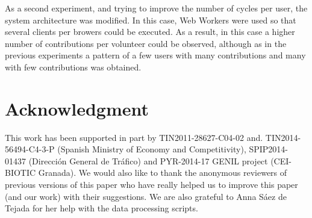 \documentclass[journal,onecolumn]{IEEEtran}
\begin{document}
As a second experiment, and trying to improve the number of cycles per user, the system architecture was modified. In this case, Web Workers were used so that several clients per browers could be executed.
As a result, in this case a higher number of contributions per volunteer could be observed, although as in the previous experiments a pattern of a few users with many contributions and many with few contributions was obtained.



\section*{Acknowledgment}

This work has been supported in part by TIN2011-28627-C04-02 and.
TIN2014-56494-C4-3-P (Spanish Ministry of Economy and Competitivity),
SPIP2014-01437 (Direcci{\'o}n General de Tr{\'a}fico) and PYR-2014-17
GENIL project (CEI-BIOTIC Granada). We would also like to thank the
anonymous reviewers of previous versions of this paper who have really helped us to improve
this paper (and our work) with their suggestions. We are also grateful
to Anna S\'aez de Tejada for her help with the data processing scripts.




\end{document}
